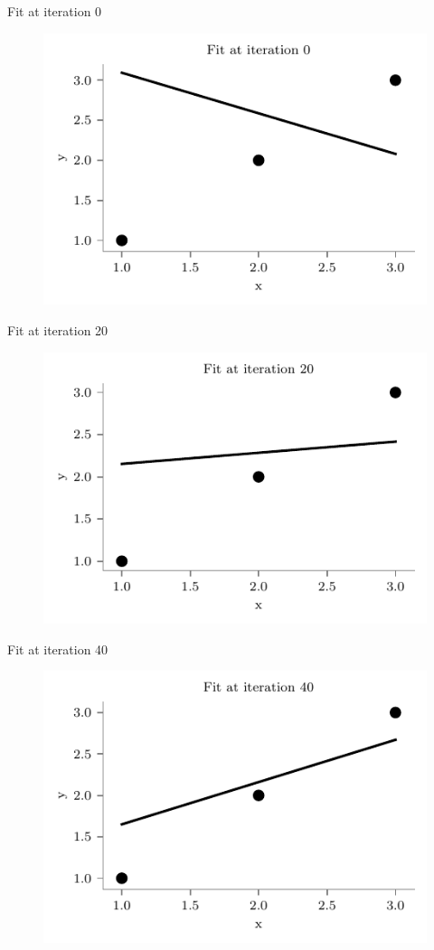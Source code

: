 \documentclass{beamer}
\begin{document}
\begin{frame}{Fit at iteration 0}
\begin{figure}
	\centering
	\includegraphics[width=0.7\linewidth]{gradient-descent/fit-iteration-0.pdf}
\end{figure}
\end{frame}

\begin{frame}{Fit at iteration 20}
\begin{figure}
	\centering
	\includegraphics[width=0.7\linewidth]{gradient-descent/fit-iteration-20.pdf}
\end{figure}
\end{frame}

\begin{frame}{Fit at iteration 40}
\begin{figure}
	\centering
	\includegraphics[width=0.7\linewidth]{gradient-descent/fit-iteration-40.pdf}
\end{figure}
\end{frame}
\end{document}
